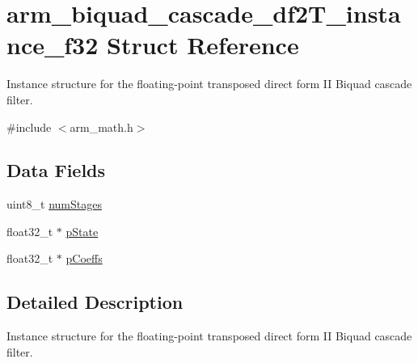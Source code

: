 \hypertarget{structarm__biquad__cascade__df2_t__instance__f32}{\section{arm\-\_\-biquad\-\_\-cascade\-\_\-df2\-T\-\_\-instance\-\_\-f32 Struct Reference}
\label{structarm__biquad__cascade__df2_t__instance__f32}
}


Instance structure for the floating-\/point transposed direct form I\-I Biquad cascade filter.  




{\ttfamily \#include $<$arm\-\_\-math.\-h$>$}

\subsection*{Data Fields}
\begin{DoxyCompactItemize}
\item 
uint8\-\_\-t \hyperlink{structarm__biquad__cascade__df2_t__instance__f32_a3615af038f56917909e0370c11bc2ec7}{num\-Stages}
\item 
float32\-\_\-t $\ast$ \hyperlink{structarm__biquad__cascade__df2_t__instance__f32_a335c87e6fdc4b96601d95a5de8b9c463}{p\-State}
\item 
float32\-\_\-t $\ast$ \hyperlink{structarm__biquad__cascade__df2_t__instance__f32_aacbb8dd8eeba4b21fc2bb40076405ee3}{p\-Coeffs}
\end{DoxyCompactItemize}


\subsection{Detailed Description}
Instance structure for the floating-\/point transposed direct form I\-I Biquad cascade filter. 


